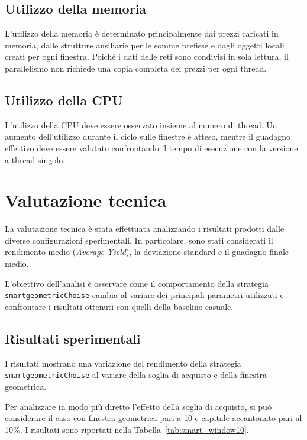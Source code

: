 \documentclass[12pt,a4paper,oneside]{report}
\begin{document}
\subsection{Utilizzo della memoria}

L'utilizzo della memoria è determinato principalmente dai prezzi caricati in
memoria, dalle strutture ausiliarie per le somme prefisse e dagli oggetti
locali creati per ogni finestra. Poiché i dati delle reti sono condivisi in
sola lettura, il parallelismo non richiede una copia completa dei prezzi per
ogni thread.

\subsection{Utilizzo della CPU}

L'utilizzo della CPU deve essere osservato insieme al numero di thread. Un
aumento dell'utilizzo durante il ciclo sulle finestre è atteso, mentre il
guadagno effettivo deve essere valutato confrontando il tempo di esecuzione
con la versione a thread singolo.


\section{Valutazione tecnica}

La valutazione tecnica è stata effettuata analizzando i risultati prodotti
dalle diverse configurazioni sperimentali. In particolare, sono stati
considerati il rendimento medio (\textit{Average Yield}), la deviazione
standard e il guadagno finale medio.

L'obiettivo dell'analisi è osservare come il comportamento della strategia
\texttt{smartgeometricChoise} cambia al variare dei principali parametri
utilizzati e confrontare i risultati ottenuti con quelli della baseline
casuale.

\subsection{Risultati sperimentali}

I risultati mostrano una variazione del rendimento della strategia
\texttt{smartgeometricChoise} al variare della soglia di acquisto e della
finestra geometrica.

Per analizzare in modo più diretto l'effetto della soglia di acquisto, si può
considerare il caso con finestra geometrica pari a 10 e capitale accantonato
pari al 10\%. I risultati sono riportati nella
Tabella~\ref{tab:smart_window10}.
\end{document}
